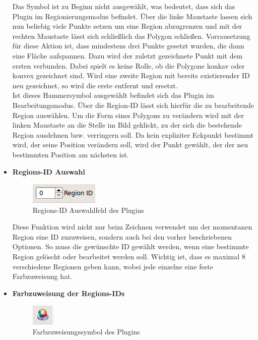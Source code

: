 \begin{itemize}
Das Symbol ist zu Beginn nicht ausgew\"ahlt, was bedeutet, dass sich das Plugin im Regionierungsmodus befindet. \"Uber die linke Maustaste lassen sich nun beliebig viele Punkte setzen um eine Region abzugrenzen und mit der rechten Maustaste l\"asst sich schlie\ss lich das Polygon schlie\ss en. Vorrausetzung f\"ur diese Aktion ist, dass mindestens drei Punkte gesetzt wurden, die dann eine Fl\"ache aufspannen. Dazu wird der zuletzt gezeichnete Punkt mit dem ersten verbunden. Dabei spielt es keine Rolle, ob die Polygone konkav oder konvex gezeichnet sind. Wird eine zweite Region mit bereits existierender ID neu gezeichnet, so wird die erste entfernt und ersetzt. \\
Ist dieses Hammersymbol ausgew\"ahlt befindet sich das Plugin im Bearbeitungsmodus. \"Uber die Region-ID l\"asst sich hierf\"ur die zu bearbeitende Region ausw\"ahlen. Um die Form eines Polygons zu ver\"andern wird mit der linken Maustaste an die Stelle im Bild geklickt, zu der sich die bestehende Region ausdehnen bzw. verringern soll. Da kein expliziter Eckpunkt bestimmt wird, der seine Position ver\"andern soll, wird der Punkt gew\"ahlt, der der neu bestimmten Position am n\"achsten ist.
\newline
\item \textbf{Regions-ID Auswahl}

\begin{figure}[h]
\centering
\includegraphics{gfx/Handbuch/regionID.png}
\caption[Regions-ID Auswahlfeld des Plugins]{Regions-ID Auswahlfeld des Plugins}
\label{gr:auswahl}
\end{figure}
\FloatBarrier

Diese Funktion wird nicht nur beim Zeichnen verwendet um der momentanen Region eine ID zuzuweisen, sondern auch bei den vorher beschriebenen Optionen. So muss die gew\"unschte ID gew\"ahlt werden, wenn eine bestimmte Region gel\"oscht oder bearbeitet werden soll. Wichtig ist, dass es maximal 8 verschiedene Regionen geben kann, wobei jede einzelne eine feste Farbzuweisung hat.
\newline
\item \textbf{Farbzuweisung der Regions-IDs}

\begin{figure}[h]
\centering
\includegraphics{gfx/Handbuch/chroma.png}
\caption[Farbzuweisungssymbol des Plugins]{Farbzuweisungssymbol des Plugins}
\label{gr:chroma}
\end{figure}
\FloatBarrier


\end{itemize}
